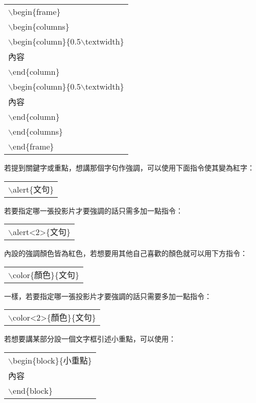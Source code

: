 \documentclass[12pt, a4paper]{article}
\begin{document}
\begin{center}\colorbox{slight}{\begin{tabular}{p{}}
    $\backslash$begin\{frame\}\\
    $\backslash$begin\{columns\}\\
    $\backslash$begin\{column\}\{0.5$\backslash$textwidth\}\\
    內容\\
    $\backslash$end\{column\}\\
    $\backslash$begin\{column\}\{0.5$\backslash$textwidth\}\\
    內容\\
    $\backslash$end\{column\}\\
    $\backslash$end\{columns\}\\
    $\backslash$end\{frame\}\\
\end{tabular}}
\end{center}
若提到關鍵字或重點，想講那個字句作強調，可以使用下面指令使其變為紅字：
\begin{center}\colorbox{slight}{\begin{tabular}{p{}}
	{$\backslash$alert\{文句\}}
\end{tabular}}
\end{center}
若要指定哪一張投影片才要強調的話只需多加一點指令：
\begin{center}\colorbox{slight}{\begin{tabular}{p{}}
	{$\backslash$alert<2>\{文句\}}
\end{tabular}}
\end{center}
內設的強調顏色皆為紅色，若想要用其他自己喜歡的顏色就可以用下方指令：
\begin{center}\colorbox{slight}{\begin{tabular}{p{}}
	{$\backslash$color\{顏色\}\{文句\}}
\end{tabular}}
\end{center}
一樣，若要指定哪一張投影片才要強調的話只需要多加一點指令：
\begin{center}\colorbox{slight}{\begin{tabular}{p{}}
	{$\backslash$color<2>\{顏色\}\{文句\}}
\end{tabular}}
\end{center}
若想要講某部分設一個文字框引述小重點，可以使用：
\begin{center}\colorbox{slight}{\begin{tabular}{p{}}
	$\backslash$begin\{block\}\{小重點\}\\
	內容\\
	$\backslash$end\{block\}\\
\end{tabular}}
\end{center}
\end{document}
